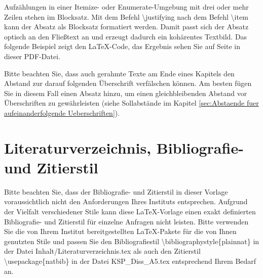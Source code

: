 
Aufzählungen in einer Itemize- oder Enumerate-Umgebung mit drei oder mehr Zeilen stehen im Blocksatz. Mit dem Befehl \glqq \textbackslash justifying\grqq{} nach dem Befehl \glqq \textbackslash item\grqq{} kann der Absatz als Blocksatz formatiert werden. Damit passt sich der Absatz optisch an den Fließtext an und erzeugt dadurch ein kohärentes Textbild. Das folgende Beispiel zeigt den \LaTeX-Code, das Ergebnis sehen Sie auf Seite \pageref{itm:BeispielItemize} in dieser PDF-Datei.


Bitte beachten Sie, dass auch gerahmte Texte am Ende eines Kapitels den Abstand zur darauf folgenden Überschrift verfälschen können. Am besten fügen Sie in diesem Fall einen Absatz hinzu, um einen gleichbleibenden Abstand vor Überschriften zu gewährleisten (siehe Sollabstände im Kapitel \ref{sec:Abstaende fuer aufeinanderfolgende Ueberschriften}).





\section[Literaturverzeichnis, Bibliografie- und Zitierstil]{Literaturverzeichnis, Bibliografie- \newline und Zitierstil}
Bitte beachten Sie, dass der Bibliografie- und Zitierstil in dieser Vorlage voraussichtlich nicht den Anforderungen Ihres Instituts entsprechen. Aufgrund der Vielfalt verschiedener Stile kann diese \LaTeX-Vorlage einen exakt definierten Bibliografie- und Zitierstil für einzelne Anfragen nicht leisten. Bitte verwenden Sie die von Ihrem Institut bereitgestellten \LaTeX-Pakete für die von Ihnen genutzten Stile und passen Sie den Bibliografiestil \glqq \textbackslash bibliographystyle\{plainnat\}\grqq{} in der Datei \glqq Inhalt/Literaturverzeichnis.tex\grqq{} als auch den Zitierstil \glqq \textbackslash usepack\-age\{natbib\}\grqq{} in der Datei \glqq KSP\_Diss\_A5.tex\grqq{} entsprechend Ihrem Bedarf an. 


